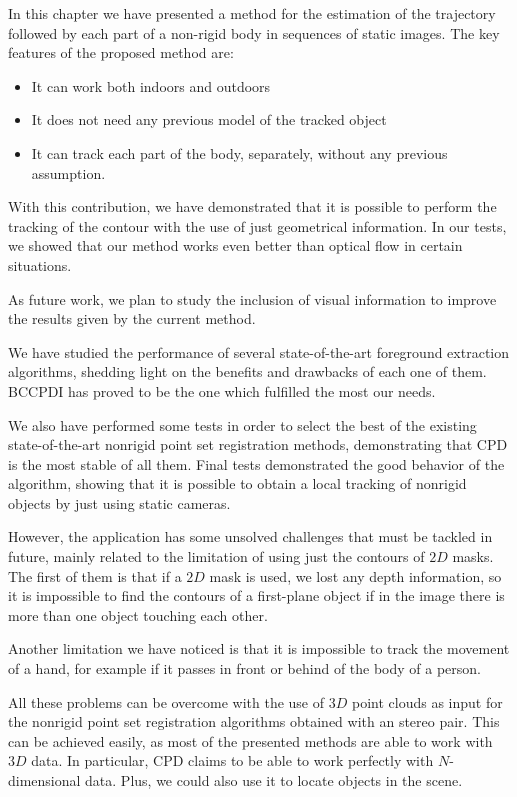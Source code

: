 In this chapter we have presented a method for the estimation of the trajectory followed by each part of a non-rigid body in sequences of static images. The key features of the proposed method are:
\begin{itemize}
 \item It can work both indoors and outdoors
 \item It does not need any previous model of the tracked object
 \item It can track each part of the body, separately, without any previous assumption.
\end{itemize}

With this contribution, we have demonstrated that it is possible to perform the tracking of the contour with the use of just geometrical information. In our tests, we showed that our method works even better than optical flow in certain situations. 

As future work, we plan to study the inclusion of visual information to improve the results given by the current method.

We have studied the performance of several state-of-the-art foreground extraction algorithms, shedding light on the 
benefits and drawbacks of each one of them. BCCPDI has proved to be the one which fulfilled the most our needs. 

We also have performed some tests in order to select the best of the existing state-of-the-art nonrigid point set registration methods, demonstrating that CPD is the most stable of all them. Final tests demonstrated the good behavior of the algorithm, showing that it is possible to obtain a local tracking of nonrigid objects by just using static cameras.

However, the application has some unsolved challenges that must be tackled in future, mainly related to the 
limitation of using just the contours of $2D$ masks. The first of them is that if a  $2D$ mask is used, we lost any 
depth information, so it is impossible to find the contours of a first-plane object if in the image there is more than 
one object touching each other. 

Another limitation we have noticed is that it is impossible to track the movement of a hand, for example if it 
passes in front or behind of the body of a person. 

All these problems can be overcome with the use of $3D$ point clouds as input for the nonrigid point set registration 
algorithms obtained with an stereo pair. This can be achieved easily, as most of the presented methods are able to work 
with $3D$ data. In particular, CPD claims to be able to work perfectly with $N$-dimensional data. Plus, we could also 
use it to locate objects in the scene.

